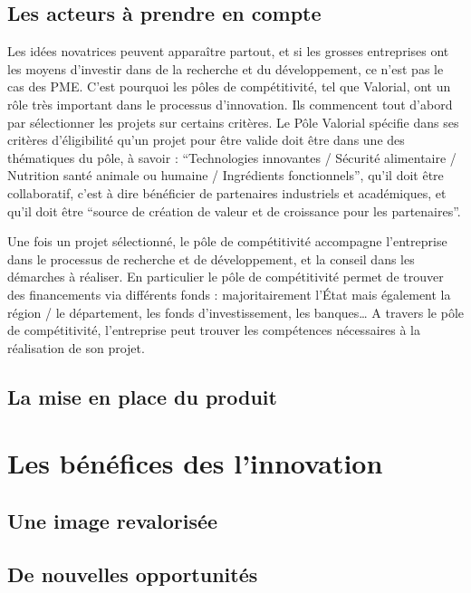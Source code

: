 \documentclass[a4paper,10pt]{report}
\begin{document}
		\subsection{Les acteurs à prendre en compte}
			Les idées novatrices peuvent apparaître partout, et si les grosses entreprises ont les moyens d’investir dans de la recherche et du développement, ce n’est pas le cas des PME. C’est pourquoi les pôles de compétitivité, tel que Valorial, ont un rôle très important dans le processus d’innovation. Ils commencent tout d’abord par sélectionner les projets sur certains critères. Le Pôle Valorial spécifie dans ses critères d’éligibilité\cite{Eligibilite} qu’un projet pour être valide doit être dans une des thématiques du pôle, à savoir : “Technologies innovantes / Sécurité alimentaire / Nutrition santé animale ou humaine / Ingrédients fonctionnels”, qu’il doit être collaboratif, c’est à dire bénéficier de partenaires industriels et académiques, et qu’il doit être “source de création de valeur et de croissance pour les partenaires”.
			
			Une fois un projet sélectionné, le pôle de compétitivité accompagne l’entreprise dans le processus de recherche et de développement, et la conseil dans les démarches à réaliser. En particulier le pôle de compétitivité permet de trouver des financements via différents fonds : majoritairement l’État mais également la région / le département, les fonds d’investissement, les banques…
			A travers le pôle de compétitivité, l’entreprise peut trouver les compétences nécessaires à la réalisation de son projet.
				
		\subsection{La mise en place du produit}
			
	\section{Les bénéfices des l'innovation}
		
		\subsection{Une image revalorisée}
				
		\subsection{De nouvelles opportunités}
				
\end{document}
